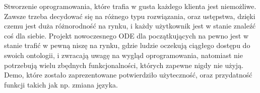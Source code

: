 \documentclass[a4paper,12pt, twoside]{book} %
\begin{document}
Stworzenie oprogramowania, które trafia w gusta każdego klienta jest niemożliwe. Zawsze trzeba decydować się na różnego typu rozwiązania, oraz ustępstwa, dzięki czemu jest duża różnorodność na rynku, i każdy użytkownik jest w stanie znaleźć coś dla siebie. Projekt nowoczesnego ODE dla początkujących na pewno jest w stanie trafić w pewną niszę na rynku, gdzie ludzie oczekują ciągłego dostępu do swoich ontologii, i zwracają uwagę na wygląd oprogramowania, natomiast nie potrzebują wielu zbędnych funkcjonalności, których zapewne nigdy nie użyją. Demo, które zostało zaprezentowane potwierdziło użyteczność, oraz przydatność funkcji takich jak np. zmiana języka.

\listoftables{} %

\listoffigures{} %
\lstlistoflistings
{}

\printbibliography[title=Bibliografia]

\end{document}
